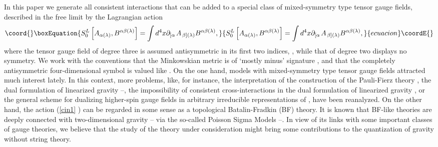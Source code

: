 \documentclass[a4paper,12pt]{article}
\begin{document}
In this paper we generate all consistent interactions that can be added to a
special class of mixed-symmetry type tensor gauge fields, described in the
free limit by the Lagrangian action
\begin{equation}\coord{}\boxEquation{
S_{0}^{L}\left[ A_{\alpha (\lambda )},B^{\alpha \beta (\lambda )}\right]
=\int d^{4}x\partial _{\left[ \alpha \right. }A_{\left. \beta \right]
(\lambda )}B^{\alpha \beta (\lambda )},  \label{cin1}
}{
S_{0}^{L}\left[ A_{\alpha (\lambda )},B^{\alpha \beta (\lambda )}\right]
=\int d^{4}x\partial _{\left[ \alpha \right. }A_{\left. \beta \right]
(\lambda )}B^{\alpha \beta (\lambda )},  }{ecuacion}\coordE{}\end{equation}
where the tensor gauge field of degree three is assumed antisymmetric in its
first two indices, \coordHE{}%
, while that of degree two displays no symmetry. We work with the
conventions that the Minkowskian metric \coordHE{} is of
`mostly minus' signature \myHighlight{$\left( +,-,-,-\right) $}\coordHE{}, and that the
completely antisymmetric four-dimensional symbol \myHighlight{$\varepsilon
^{\alpha \beta \gamma \delta }$}\coordHE{} is valued like \coordHE{}. On the one hand, models with mixed-symmetry type
tensor gauge fields attracted much interest lately. In this
context, more problems, like, for instance, the interpretation of
the construction of the Pauli-Fierz theory \cite{pf}, the dual
formulation of linearized gravity \cite{dual}--\cite{lingr}, the
impossibility of consistent cross-interactions in the dual
formulation of linearized gravity \cite{lingr},  or the general
scheme for dualizing higher-spin gauge fields in arbitrary
irreducible representations of \coordHE{} \cite{dualsp},
have been reanalyzed. On the other hand, the action (\ref{cin1}%
) can be regarded in some sense as a topological Batalin-Fradkin
(BF) theory. It is known that BF-like theories are deeply
connected with two-dimensional gravity \cite{gr1}--\cite{gr7} via
the so-called Poisson Sigma Models \cite{psm1}--\cite{psm7}. In
view of its links with some important classes of gauge theories,
we believe that the study of the theory under consideration might
bring some contributions to the quantization of gravity without
string theory.
\end{document}
